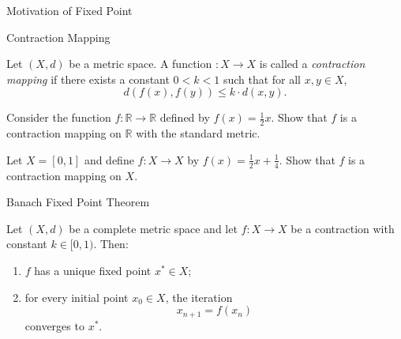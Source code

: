 \documentclass[12pt, a4paper]{article}
\begin{document}
\FrontPage
\Large

\begin{heading}
    Motivation of Fixed Point
\end{heading}

\clearpage

\begin{heading}
    Contraction Mapping
\end{heading}

\vspace{10pt}

\begin{definition}
    Let $(X, d)$ be a metric space. A function $: X \to X$ is called a \textit{contraction mapping} if there exists a constant $0 < k < 1$ such that for all $x, y \in X$,
    \[
        d(f(x), f(y)) \leq k \cdot d(x, y).
    \]
\end{definition}

\clearpage

\begin{problem}
    Consider the function $f: \mathbb{R} \to \mathbb{R}$ defined by $f(x) = \frac{1}{2}x$. Show that $f$ is a contraction mapping on $\mathbb{R}$ with the standard metric.
\end{problem}

\clearpage

\begin{problem}
    Let $X = [0, 1]$ and define $f: X \to X$ by $f(x) = \frac{1}{2}x + \frac{1}{4}$. Show that $f$ is a contraction mapping on $X$.
\end{problem}

\clearpage

\begin{heading}
    Banach Fixed Point Theorem
\end{heading}

\vspace{10pt}

\begin{theorem}
Let $(X,d)$ be a complete metric space and let $f : X \to X$ be a contraction with constant $k \in [0,1)$. Then:
\begin{enumerate}
    \item[(i)] $f$ has a unique fixed point $x^* \in X$;
    
    \item[(ii)] for every initial point $x_0 \in X$, the iteration
    \[
    x_{n+1} = f(x_n)
    \]
    converges to $x^*$.
\end{enumerate}
\end{theorem}
\end{document}
